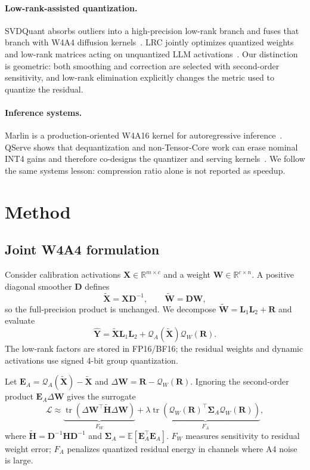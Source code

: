 \documentclass{article}
\newcommand{\X}{\bm{X}}
\newcommand{\W}{\bm{W}}
\newcommand{\Hess}{\bm{H}}
\newcommand{\D}{\bm{D}}
\newcommand{\Lo}{\bm{L}_1}
\newcommand{\Lt}{\bm{L}_2}
\newcommand{\Qw}{\mathcal{Q}_{W}}
\newcommand{\Qa}{\mathcal{Q}_{A}}
\newcommand{\tr}{\operatorname{tr}}
\begin{document}
\paragraph{Low-rank-assisted quantization.}
SVDQuant absorbs outliers into a high-precision low-rank branch and fuses that
branch with W4A4 diffusion kernels~\citep{li2024svdquant}. LRC jointly optimizes
quantized weights and low-rank matrices acting on unquantized LLM
activations~\citep{scetbon2024lrc}. Our distinction is geometric: both smoothing
and correction are selected with second-order sensitivity, and low-rank
elimination explicitly changes the metric used to quantize the residual.

\paragraph{Inference systems.}
Marlin is a production-oriented W4A16 kernel for autoregressive
inference~\citep{frantar2024marlin}. QServe shows that dequantization and
non-Tensor-Core work can erase nominal INT4 gains and therefore co-designs the
quantizer and serving kernels~\citep{lin2024qserve}. We follow the same systems
lesson: compression ratio alone is not reported as speedup.

\section{Method}
\label{sec:method}

\subsection{Joint W4A4 formulation}

Consider calibration activations $\X\in\mathbb{R}^{m\times c}$ and a weight
$\W\in\mathbb{R}^{c\times n}$. A positive diagonal smoother $\D$ defines
\begin{equation}
    \widetilde{\X}=\X\D^{-1},\qquad
    \widetilde{\W}=\D\W,
\end{equation}
so the full-precision product is unchanged. We decompose
$\widetilde{\W}=\Lo\Lt+\bm{R}$ and evaluate
\begin{equation}
\widehat{\bm{Y}}=
    \widetilde{\X}\Lo\Lt+
    \Qa(\widetilde{\X})\Qw(\bm{R}).
\label{eq:forward}
\end{equation}
The low-rank factors are stored in FP16/BF16; the residual weights and dynamic
activations use signed 4-bit group quantization.

Let $\bm{E}_A=\Qa(\widetilde{\X})-\widetilde{\X}$ and
$\Delta\W=\bm{R}-\Qw(\bm{R})$. Ignoring the second-order product
$\bm{E}_A\Delta\W$ gives the surrogate
\begin{equation}
\mathcal{L}\approx
\underbrace{\tr(\Delta\W^\top\widetilde{\Hess}\Delta\W)}_{F_W}
+\lambda
\underbrace{\tr(\Qw(\bm{R})^\top\bm{\Sigma}_A\Qw(\bm{R}))}_{F_A},
\label{eq:two-channel}
\end{equation}
where $\widetilde{\Hess}=\D^{-1}\Hess\D^{-1}$ and
$\bm{\Sigma}_A=\mathbb{E}[\bm{E}_A^\top\bm{E}_A]$. $F_W$ measures sensitivity
to residual weight error; $F_A$ penalizes quantized residual energy in channels
where A4 noise is large.
\end{document}
